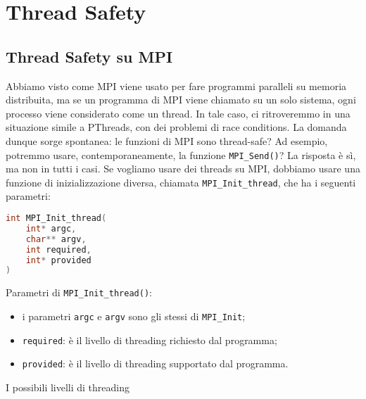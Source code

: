 \section{Thread Safety}

\subsection{Thread Safety su MPI}

Abbiamo visto come MPI viene usato per fare programmi paralleli su memoria distribuita, ma se un programma di MPI viene chiamato su un solo sistema, ogni processo viene considerato come un thread. In tale caso, ci ritroveremmo in una situazione simile a PThreads, con dei problemi di race conditions. La domanda dunque sorge spontanea: le funzioni di MPI sono thread-safe? Ad esempio, potremmo usare, contemporaneamente, la funzione \verb|MPI_Send()|?
\nl
La risposta è sì, ma non in tutti i casi. Se vogliamo usare dei threads su MPI, dobbiamo usare una funzione di inizializzazione diversa, chiamata \verb|MPI_Init_thread|, che ha i seguenti parametri:
\begin{codedefine}
    \begin{lstlisting}[language = C, numbers = none]
int MPI_Init_thread(
    int* argc,
    char** argv,
    int required,
    int* provided
)\end{lstlisting}
    \tcblower
    Parametri di \verb|MPI_Init_thread()|:
    \begin{itemize}
        \item i parametri \verb|argc| e \verb|argv| sono gli stessi di \verb|MPI_Init|;
        \item \verb|required|: è il livello di threading richiesto dal programma;
        \item \verb|provided|: è il livello di threading supportato dal programma.
    \end{itemize}
\end{codedefine}

I possibili livelli di threading 